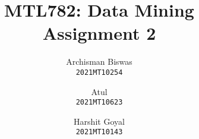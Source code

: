 \documentclass{article}
\author{
  Archisman Biswas\\
  \texttt{2021MT10254}
  \and
Atul\\
  \texttt{2021MT10623}
  \and
  Harshit  Goyal \\
  \texttt{2021MT10143}
}
\title{MTL782: Data Mining \\ Assignment 2}
\begin{document}
\maketitle
\bigskip
\tableofcontents
\newpage





\newpage

\newpage

\end{document}
